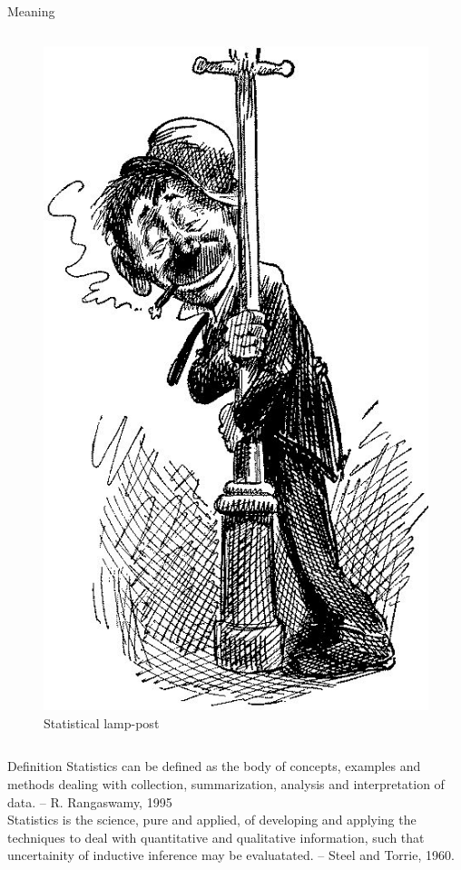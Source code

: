 \documentclass[
  ignorenonframetext,
  aspectratio=169]{beamer}
\begin{document}
\begin{frame}{Meaning}
\begin{columns}
\begin{figure}
\includegraphics[width=0.7\linewidth]{images/use-lampost-while-drunk} \caption{Statistical lamp-post}\label{fig:statistical-lamppost}
\end{figure}

\end{columns}
\end{frame}

\begin{frame}{}
\protect\hypertarget{section}{}
\begin{block}{Definition}
Statistics can be defined as the body of concepts, examples and methods dealing with collection, summarization, analysis and interpretation of data. -- R. Rangaswamy, 1995 \\[0.5cm]
Statistics is the science, pure and applied, of developing and applying the techniques to deal with quantitative and qualitative information, such that uncertainity of inductive inference may be evaluatated. -- Steel and Torrie, 1960.
\end{block}
\end{frame}
\end{document}
